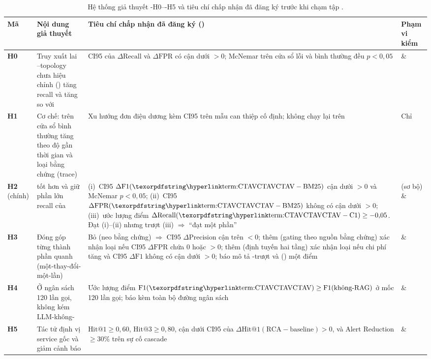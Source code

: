\begin{table}[H]
  \centering
  \caption[Giả thuyết H0--H5 và tiêu chí chấp nhận đã đăng ký]{Hệ thống giả thuyết \hyp{H0}--\hyp{H5} và tiêu chí chấp nhận đã đăng ký trước khi chạm tập .}
  \label{tab:h0-h5}
  \tblfont
  \tblsetup
  \setlength{\tabcolsep}{4pt}
  \begin{tabularx}{\linewidth}{|l|>{\raggedright\arraybackslash}p{3.4cm}|Y|>{\raggedright\arraybackslash}p{2.2cm}|}
    \hline
    \textbf{Mã} & \textbf{Nội dung giả thuyết} & \textbf{Tiêu chí chấp nhận đã đăng ký ()} & \textbf{Phạm vi kiểm} \\
    \hline
    \textbf{H0} & Truy xuất lai --topology chưa hiệu chỉnh () tăng recall và tăng  so với  & CI95 của $\Delta\text{Recall}$ và $\Delta\text{FPR}$ có cận dưới $> 0$; McNemar trên cửa sổ lỗi và bình thường đều $p < 0{,}05$ &  \&  \\
    \hline
    \textbf{H1} & Cơ chế:  trên cửa sổ bình thường tăng theo độ gần thời gian và loại bằng chứng (trace) & Xu hướng đơn điệu dương kèm CI95 trên mẫu can thiệp cố định; không chạy lại trên  & Chỉ  \\
    \hline
    \textbf{H2} (chính) & \CTAV{} tốt hơn  và giữ phần lớn recall của  & (i)~CI95 $\Delta\text{F1}(\text{\CTAV}-\text{BM25})$ cận dưới $> 0$ và McNemar $p < 0{,}05$; (ii)~CI95 $\Delta\text{FPR}(\text{\CTAV}-\text{BM25})$ không có cận dưới $> 0$; (iii)~ước lượng điểm $\Delta\text{Recall}(\text{\CTAV}-\text{C1}) \ge -0{,}05$. Đạt (i)--(ii) nhưng trượt (iii) $\Rightarrow$ ``đạt một phần'' &  (sơ bộ) \&  \\
    \hline
    \textbf{H3} & Đóng góp từng thành phần quanh \CTAV{} (một-thay-đổi-một-lần) & Bỏ  (neo bằng chứng) $\Rightarrow$ CI95 $\Delta\text{Precision}$ cận trên $< 0$; thêm  (gating theo nguồn bằng chứng) xác nhận loại nếu CI95 $\Delta\text{FPR}$ chứa $0$ hoặc $> 0$; thêm  (định tuyến hai tầng) xác nhận loại nếu chi phí tăng và CI95 $\Delta\text{F1}$ không có cận dưới $> 0$; báo mô tả -trượt và  () một điểm &  \&  \\
    \hline
    \textbf{H4} & Ở ngân sách 120 lần gọi, \CTAV{} không kém LLM-không- & Ước lượng điểm $\text{F1}(\text{\CTAV}) \ge \text{F1}(\text{không-RAG})$ ở mốc 120 lần gọi; báo kèm toàn bộ đường ngân sách &  \&  \\
    \hline
    \textbf{H5} & Tác tử  định vị service gốc và giảm cảnh báo & $\text{Hit@1} \ge 0{,}60$, $\text{Hit@3} \ge 0{,}80$, cận dưới CI95 của $\Delta\text{Hit@1}(\text{RCA}-\text{baseline}) > 0$, và Alert Reduction $\ge 30\%$ trên sự cố cascade &  \&  \\
    \hline
  \end{tabularx}
\end{table}

